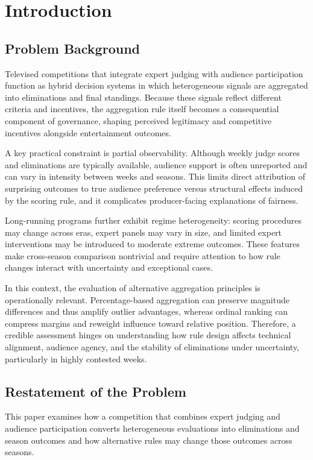\section{Introduction}

\subsection{Problem Background}

Televised competitions that integrate expert judging with audience participation function as hybrid decision systems in which heterogeneous signals are aggregated into eliminations and final standings. Because these signals reflect different criteria and incentives, the aggregation rule itself becomes a consequential component of governance, shaping perceived legitimacy and competitive incentives alongside entertainment outcomes.

A key practical constraint is partial observability. Although weekly judge scores and eliminations are typically available, audience support is often unreported and can vary in intensity between weeks and seasons. This limits direct attribution of surprising outcomes to true audience preference versus structural effects induced by the scoring rule, and it complicates producer-facing explanations of fairness.

Long-running programs further exhibit regime heterogeneity: scoring procedures may change across eras, expert panels may vary in size, and limited expert interventions may be introduced to moderate extreme outcomes. These features make cross-season comparison nontrivial and require attention to how rule changes interact with uncertainty and exceptional cases.

In this context, the evaluation of alternative aggregation principles is operationally relevant. Percentage-based aggregation can preserve magnitude differences and thus amplify outlier advantages, whereas ordinal ranking can compress margins and reweight influence toward relative position. Therefore, a credible assessment hinges on understanding how rule design affects technical alignment, audience agency, and the stability of eliminations under uncertainty, particularly in highly contested weeks.

\subsection{Restatement of the Problem}

This paper examines how a competition that combines expert judging and audience participation converts heterogeneous evaluations into eliminations and season outcomes and how alternative rules may change those outcomes across seasons.

